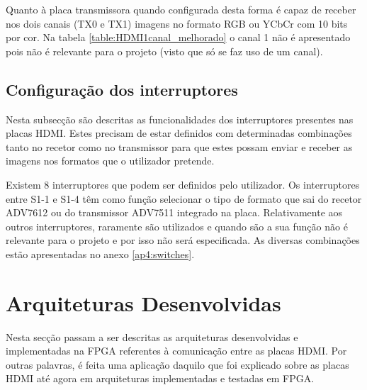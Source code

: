 Quanto à placa transmissora quando configurada desta forma é capaz de receber nos dois canais (TX0 e TX1) imagens no formato RGB ou YCbCr com 10 bits por cor. Na tabela \ref{table:HDMI1canal_melhorado} o canal 1 não é apresentado pois não é relevante para o projeto (visto que só se faz uso de um canal).

\subsection{Configuração dos interruptores}

Nesta subsecção são descritas as funcionalidades dos interruptores presentes nas placas HDMI. Estes precisam de estar definidos com determinadas combinações tanto no recetor como no transmissor para que estes possam enviar e receber as imagens nos formatos que o utilizador pretende.

Existem 8 interruptores que podem ser definidos pelo utilizador. Os interruptores entre S1-1 e S1-4 têm como função selecionar o tipo de formato que sai do recetor ADV7612 ou do transmissor ADV7511 integrado na placa. Relativamente aos outros interruptores, raramente são utilizados e quando são a sua função não é relevante para o projeto e por isso não será especificada. As diversas combinações estão apresentadas no anexo \ref{ap4:switches}.


\section{Arquiteturas Desenvolvidas} \label{sec:HDMIarquiteturas}

Nesta secção passam a ser descritas as arquiteturas desenvolvidas e implementadas na FPGA referentes à comunicação entre as placas HDMI.  Por outras palavras, é feita uma aplicação daquilo que foi explicado sobre as placas HDMI até agora em arquiteturas implementadas e testadas em FPGA.

